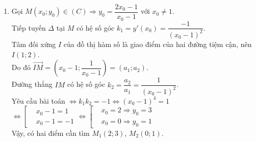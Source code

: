 \begin{bt}
{\begin{enumerate}
\begin{itemize}
\begin{center}
				\end{center}
			\end{itemize}
			\item 
			Gọi $ M\left(x_0;y_0\right) \in (C) \Rightarrow y_0=\dfrac{2x_0-1}{x_0-1}$ với $x_0\ne 1$.\\
			Tiếp tuyến $\Delta$ tại $M$ có hệ số góc $k_1=y'(x_0)=\dfrac{-1}{(x_0-1)^2}$.\\
			Tâm đối xứng $I$ của đồ thị hàm số là giao điểm của hai đường tiệm cận, nên $I(1;2)$.\\
			Do đó $\overrightarrow{IM}=\left(x_0-1;\dfrac{1}{x_0-1}\right)=(a_1;a_2)$.\\
			Đường thẳng $IM$ có hệ số góc $k_2=\dfrac{a_2}{a_1}=\dfrac{1}{(x_0-1)^2}$.\\
			Yêu cầu bài toán $ \Leftrightarrow k_1k_2=-1\Leftrightarrow(x_0-1)^4=1 $\\
			$ \Leftrightarrow\left[\begin{aligned}
			&x_0-1=1\\
			&x_0-1=-1
			\end{aligned}\right.
			\Leftrightarrow\left[\begin{aligned}
			&x_0=2 \Rightarrow y_0=3\\
			&x_0=0\Rightarrow y_0=1
			\end{aligned}\right.
			$\\
			Vậy, có hai điểm cần tìm $M_1(2;3)$, $M_2(0;1)$.
			
			
		\end{enumerate}
	}
\end{bt}

